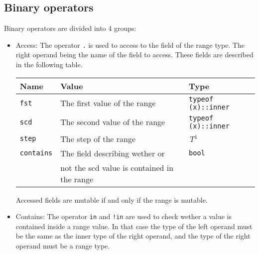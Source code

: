 \subsection {Binary operators}

Binary operators are divided into 4 groups:

\begin{itemize}
\item Access: The operator \texttt{.} is used to access to the field of the
  range type. The right operand being the name of the field to access. These
  fields are described in the following table.

  \vspace{-20pt}%
  \begin{center}\begin{adjustbox}{max width=\linewidth}
    \begin{threeparttable}
      \begin{tabular}{|l|ll|}
        \hline
        Name & Value & Type\\
        \hline
        \hline
        \texttt {fst} & The first value of the range & \texttt{typeof (x)::inner} \\
        \texttt {scd} & The second value of the range & \texttt{typeof (x)::inner} \\
        \texttt {step} & The step of the range & \textit{T}$^{1^{\phantom{j}}}$ \\
        \texttt {contains} & The field describing wether or  & \texttt{bool} \\
        & not the scd value is contained in the range &\\
        \hline
      \end{tabular}
    \end{threeparttable}
\end{adjustbox}\end{center}

Accessed fields are mutable if and only if the range is mutable.

\item Contains: The operator \texttt{in} and \texttt{!in} are used to check
  wether a value is contained inside a range value. In that case the type of the
  left operand must be the same as the inner type of the right operand, and the
  type of the right operand must be a range type.


\end{itemize}

